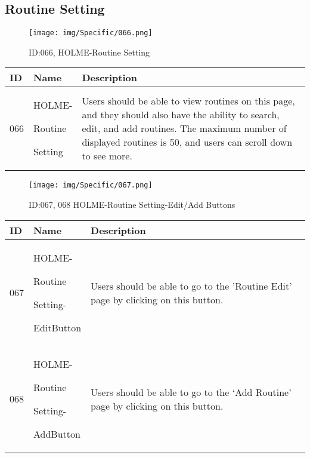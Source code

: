\documentclass[conference]{IEEEtran}
\begin{document}
\begin{enumerate}
\subsection{Routine Setting}
\begin{figure}[h]
\centering
\texttt{[image: img/Specific/066.png]}
\caption{ID:066, HOLME-Routine Setting}
\end{figure}
\begin{table}[h]
\def\arraystretch{1.2} \small
    \begin{tabular}{|p{1cm}|p{1.8cm}|p{5.0cm}|}
        \hline
        ID & Name & Description\\ \hline
         066 \par  & HOLME-\par Routine \par Setting  & 

Users should be able to view routines on this page, and they should also have the ability to search, edit, and add routines. The maximum number of displayed routines is 50, and users can scroll down to see more. \\ \hline
    \end{tabular}
\end{table}

\begin{figure}[h]
\centering
\texttt{[image: img/Specific/067.png]}
\caption{ID:067, 068 HOLME-Routine Setting-Edit/Add Buttons}
\end{figure}
\begin{table}[h]
\def\arraystretch{1.2} \small
    \begin{tabular}{|p{1cm}|p{1.8cm}|p{5.0cm}|}
        \hline
        ID & Name & Description\\ \hline
         067 \par  & HOLME-\par Routine \par Setting- \par EditButton & 
Users should be able to go to the 'Routine Edit' page by clicking on this button.\\ \hline
         068 \par  & HOLME-\par Routine \par Setting- \par AddButton & 

Users should be able to go to the `Add Routine' page by clicking on this button. \\ \hline    
    \end{tabular}
\end{table}


\end{enumerate}
\end{document}
